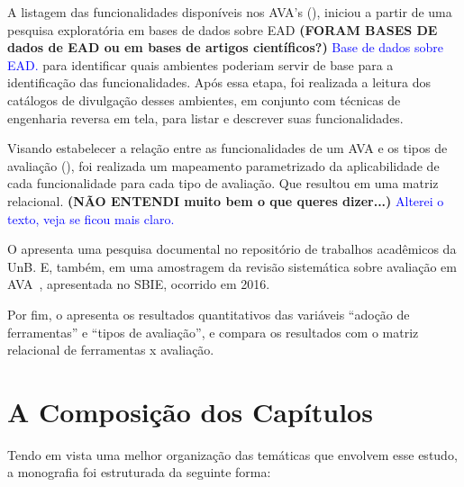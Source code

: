 A listagem das funcionalidades disponíveis nos AVA's (), iniciou a partir de uma pesquisa exploratória em bases de dados sobre EAD\textbf{ (FORAM BASES DE dados de EAD ou em bases de artigos científicos?)} \textcolor{blue} {Base de dados sobre EAD.} para identificar quais ambientes poderiam servir de base para a identificação das funcionalidades. Após essa etapa, foi realizada a leitura dos catálogos de divulgação desses ambientes, em conjunto com técnicas de engenharia reversa em tela, para listar e descrever suas funcionalidades.

Visando estabelecer a relação entre as funcionalidades de um AVA e os tipos de avaliação (), foi realizada um mapeamento parametrizado da aplicabilidade de cada funcionalidade para cada tipo de avaliação. Que resultou em uma matriz relacional. \textbf{ (NÃO ENTENDI muito bem o que queres dizer...)} \textcolor{blue}{Alterei o texto, veja se ficou mais claro.}

O  apresenta uma pesquisa documental no repositório de trabalhos acadêmicos da \acrfull{UnB}. E, também, em uma amostragem da revisão sistemática sobre avaliação em AVA~\cite{Ferreira@2016}, apresentada no \acrfull{SBIE}, ocorrido em 2016.

Por fim, o  apresenta os resultados quantitativos das variáveis ``adoção de ferramentas'' e ``tipos de avaliação'', e compara os resultados com o matriz relacional de ferramentas x avaliação. 

\section{A Composição dos Capítulos}\label{chap:comp}%

Tendo em vista uma melhor organização das temáticas que envolvem esse estudo, a monografia foi estruturada da seguinte forma:

